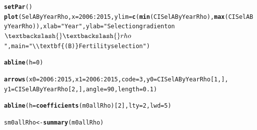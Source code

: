 \documentclass{article}\usepackage[]{graphicx}\usepackage[]{color}
\makeatletter
\newcommand{\hlnum}[1]{\textcolor[rgb]{0.686,0.059,0.569}{#1}}%
\newcommand{\hlstr}[1]{\textcolor[rgb]{0.192,0.494,0.8}{#1}}%
\newcommand{\hlopt}[1]{\textcolor[rgb]{0,0,0}{#1}}%
\newcommand{\hlstd}[1]{\textcolor[rgb]{0.345,0.345,0.345}{#1}}%
\newcommand{\hlkwb}[1]{\textcolor[rgb]{0.69,0.353,0.396}{#1}}%
\newcommand{\hlkwc}[1]{\textcolor[rgb]{0.333,0.667,0.333}{#1}}%
\newcommand{\hlkwd}[1]{\textcolor[rgb]{0.737,0.353,0.396}{\textbf{#1}}}%
\newenvironment{kframe}{%
 \def\at@end@of@kframe{}%
 \ifinner\ifhmode%
  \def\at@end@of@kframe{\end{minipage}}%
  \begin{minipage}{\columnwidth}%
 \fi\fi%
 \def\FrameCommand##1{\hskip\@totalleftmargin \hskip-\fboxsep
 \colorbox{shadecolor}{##1}\hskip-\fboxsep
     \hskip-\linewidth \hskip-\@totalleftmargin \hskip\columnwidth}%
 \MakeFramed {\advance\hsize-\width
   \@totalleftmargin\z@ \linewidth\hsize
   \@setminipage}}%
 {\par\unskip\endMakeFramed%
 \at@end@of@kframe}
\newenvironment{knitrout}{}{} %
\makeatother
\begin{document}
\begin{knitrout}
\color{fgcolor}\begin{kframe}
\begin{alltt}
\hlkwd{setPar}\hlstd{()}
\hlkwd{plot}\hlstd{(SelAByYearRho,} \hlkwc{x}\hlstd{=}\hlnum{2006}\hlopt{:}\hlnum{2015}\hlstd{,} \hlkwc{ylim}\hlstd{=}\hlkwd{c}\hlstd{(}\hlkwd{min}\hlstd{( CISelAByYearRho),} \hlkwd{max}\hlstd{( CISelAByYearRho)),} \hlkwc{xlab}\hlstd{=}\hlstr{"Year"}\hlstd{,} \hlkwc{ylab} \hlstd{=} \hlstr{"Selection gradient on $\textbackslash{}\textbackslash{}rho$"}\hlstd{,} \hlkwc{main} \hlstd{=} \hlstr{"\textbackslash{}\textbackslash{}textbf\{(B)\} Fertility selection"}\hlstd{)}
\end{alltt}


{\ttfamily\noindent\bfseries\color{errorcolor}{\#\# Error in xy.coords(x, y, xlabel, ylabel, log): object 'SelAByYearRho' not found}}\begin{alltt}
\hlkwd{abline}\hlstd{(}\hlkwc{h}\hlstd{=}\hlnum{0}\hlstd{)}
\end{alltt}


{\ttfamily\noindent\bfseries\color{errorcolor}{\#\# Error in int\_abline(a = a, b = b, h = h, v = v, untf = untf, ...): plot.new has not been called yet}}\begin{alltt}
\hlkwd{arrows}\hlstd{(}\hlkwc{x0} \hlstd{=} \hlnum{2006}\hlopt{:}\hlnum{2015}\hlstd{,}\hlkwc{x1} \hlstd{=} \hlnum{2006}\hlopt{:}\hlnum{2015}\hlstd{,}\hlkwc{code} \hlstd{=} \hlnum{3}\hlstd{,} \hlkwc{y0} \hlstd{= CISelAByYearRho[}\hlnum{1}\hlstd{,],}
       \hlkwc{y1} \hlstd{= CISelAByYearRho[}\hlnum{2}\hlstd{,],} \hlkwc{angle} \hlstd{=} \hlnum{90}\hlstd{,}\hlkwc{length} \hlstd{=} \hlnum{0.1}\hlstd{)}
\end{alltt}


{\ttfamily\noindent\bfseries\color{errorcolor}{\#\# Error in arrows(x0 = 2006:2015, x1 = 2006:2015, code = 3, y0 = CISelAByYearRho[1, : object 'CISelAByYearRho' not found}}\begin{alltt}
\hlkwd{abline}\hlstd{(}\hlkwc{h}\hlstd{=}\hlkwd{coefficients}\hlstd{(m0allRho)[}\hlnum{2}\hlstd{],} \hlkwc{lty}\hlstd{=}\hlnum{2}\hlstd{,} \hlkwc{lwd}\hlstd{=}\hlnum{5}\hlstd{)}
\end{alltt}


{\ttfamily\noindent\bfseries\color{errorcolor}{\#\# Error in coefficients(m0allRho): object 'm0allRho' not found}}\begin{alltt}
\hlstd{sm0allRho} \hlkwb{<-} \hlkwd{summary}\hlstd{(m0allRho)}
\end{alltt}



\end{kframe}
\end{knitrout}
\end{document}
